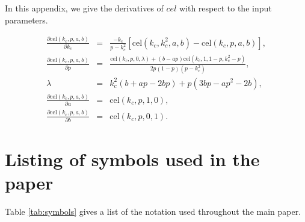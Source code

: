 \documentclass[modern]{aastex61}
\begin{document}
In this appendix, we give the derivatives of $cel$ with respect to
the input parameters.


\begin{eqnarray}
\frac{\partial \mathrm{cel}(k_c,p,a,b)}{\partial k_c} &=& \frac{-k_c}{p-k_c^2}\left[\mathrm{cel}(k_c,k_c^2,a,b)-\mathrm{cel}(k_c,p,a,b)\right],\\
\frac{\partial \mathrm{cel}(k_c,p,a,b)}{\partial p} &=& \frac{\mathrm{cel}(k_c,p,0,\lambda) +(b-ap)\mathrm{cel}(k_c,1,1-p,k_c^2-p)}{2p(1-p)(p-k_c^2)},\\ 
\lambda &=& k_c^2(b+ap-2bp)+p(3bp-ap^2-2b),\\
\frac{\partial \mathrm{cel}(k_c,p,a,b)}{\partial a } &=& \mathrm{cel}(k_c,p,1,0),\\
\frac{\partial \mathrm{cel}(k_c,p,a,b)}{\partial b} &=& \mathrm{cel}(k_c,p,0,1).
\end{eqnarray}

\section{Listing of symbols used in the paper}

Table \ref{tab:symbols} gives a list of the notation used throughout
the main paper.

\clearpage
\end{document}
